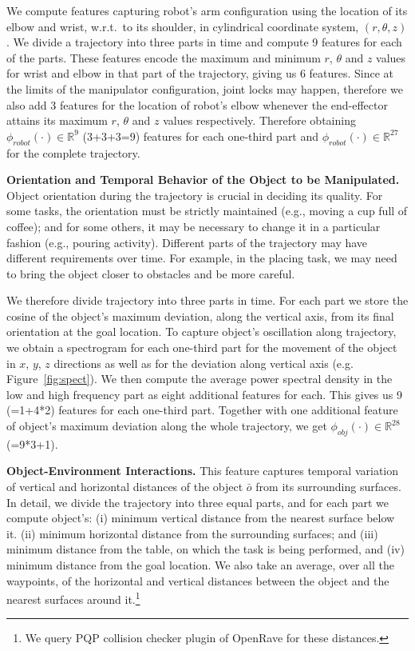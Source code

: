 We compute features capturing robot's arm configuration using the location of its elbow and wrist, w.r.t.\ to its shoulder, in cylindrical  coordinate system, $(r, \theta, z)$. We divide a trajectory into three parts in time and compute 9 features for each of the parts. These features encode the maximum and minimum $r$, $\theta$ and $z$ values for wrist and elbow in that part of the trajectory, giving us 6 features. Since at the limits of the manipulator configuration, joint locks may happen, therefore we also add 3 features for the location of robot's elbow whenever the end-effector attains its maximum $r$, $\theta$ and $z$ values respectively. Therefore obtaining $\phi_{robot}(\cdot) \in \mathbb{R}^{9}$ (3+3+3=9) features for each one-third part and $\phi_{robot}(\cdot) \in \mathbb{R}^{27}$ for the complete trajectory.

\textbf{Orientation and Temporal Behavior of the Object to be Manipulated.} {Object orientation during the trajectory is crucial in deciding its quality.} For some tasks, the orientation must be strictly maintained (e.g., moving a cup full of coffee); and for some others, it may be necessary to  change it in a particular fashion (e.g., pouring activity). Different parts of the trajectory may have different requirements over time. For example, in the placing task, we may need to bring the object closer to obstacles and be more careful. 

We therefore divide trajectory into three parts in time. For each part we store the cosine of the object's maximum deviation, along the vertical axis,  from  its final orientation at the goal location. To capture object's oscillation along trajectory, we obtain a spectrogram for each one-third part for the movement of the object in $x$, $y$, $z$ directions as well as for the deviation along vertical axis (e.g. Figure~\ref{fig:spect}).
We then compute the average power spectral density in the low and high frequency part as  eight additional features for each. This gives us 9 (=1+4*2) features for each one-third part.  Together with one additional feature of object's maximum deviation along the whole trajectory, we get $\phi_{obj}(\cdot) \in \mathbb{R}^{28}$
(=9*3+1).

\textbf{Object-Environment Interactions.} This feature captures temporal variation of vertical and horizontal distances of the object
$\bar{o}$ from its surrounding surfaces.  In detail, we divide the trajectory into three equal parts, and for each part we compute object's: (i) minimum vertical distance from the nearest surface below it. (ii) minimum horizontal distance from the surrounding surfaces; and (iii) minimum distance from the table, on which the task is being performed, and (iv) minimum distance from the goal location. We also take an average, over all the waypoints, of the horizontal and vertical distances between the object and the nearest surfaces around it.\footnote{We query PQP collision checker plugin of OpenRave for these distances.} 

